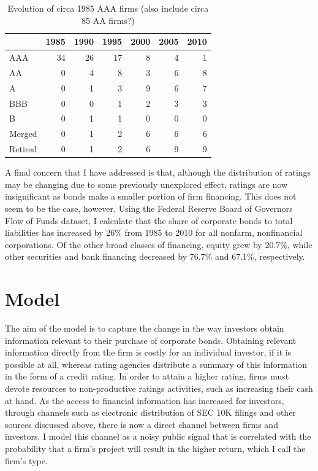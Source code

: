 \documentclass[notitlepage]{article}
\begin{document}
\begin{table}\centering
\begin{tabular}{l *{6}r}
\toprule
  	& 1985  & 1990  & 1995  & 2000  & 2005  & 2010\\ \midrule
AAA  	& 34  	& 26  	& 17  	& 8  	& 4  	& 1\\
AA  	& 0  	& 4  	& 8  	& 3  	& 6  	& 8\\
A  	& 0  	& 1  	& 3  	& 9  	& 6  	& 7\\
BBB  	& 0  	& 0  	& 1  	& 2  	& 3  	& 3\\
B  	& 0  	& 1  	& 1  	& 0  	& 0  	& 0\\
Merged 	& 0  	& 1  	& 2  	& 6  	& 6  	& 6\\
Retired	& 0  	& 1  	& 2  	& 6  	& 9  	& 9\\ 
\bottomrule
\end{tabular}
\caption{Evolution of circa 1985 AAA firms (also include circa 85 AA firms?)}
\label{tab:mrg}
\end{table}
A final concern that I have addressed is that, although the distribution of ratings may be changing due to some previously unexplored effect, ratings are now insignificant as bonds make a smaller portion of firm financing. This does not seem to be the case, however. Using the Federal Reserve Board of Governors Flow of Funds dataset, I calculate that the share of corporate bonds to total liabilities has increased by 26\% from 1985 to 2010 for all nonfarm, nonfinancial corporations. Of the other broad classes of financing, equity grew by 20.7\%, while other securities and bank financing decreased by 76.7\% and 67.1\%, respectively.

\section{Model}
\label{sec:mod}
The aim of the model is to capture the change in the way investors obtain information relevant to their purchase of corporate bonds. Obtaining relevant information directly from the firm is costly for an individual investor, if it is possible at all, whereas rating agencies distribute a summary of this information in the form of a credit rating. In order to attain a higher rating, firms must devote resources to non-productive ratings activities, such as increasing their cash at hand. As the access to financial information has increased for investors, through channels such as electronic distribution of SEC 10K filings and other sources discussed above, there is now a direct channel between firms and investors. I model this channel as a noisy public signal that is correlated with the probability that a firm's project will result in the higher return, which I call the firm's type. 
\end{document}
